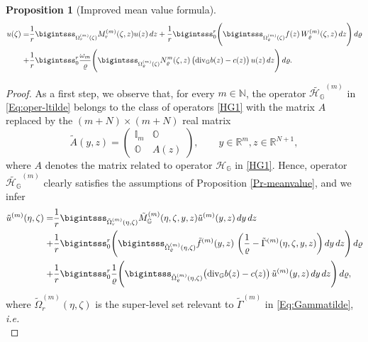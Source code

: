 \documentclass[11pt,a4paper]{article}
\newtheorem{proposition}[theorem]{\bf Proposition}
\numberwithin{equation}{section}
\newcommand{\R}{\mathbb{R}}
\newcommand{\N}{\mathbb{N}}
\def \rnn {{\mathbb {R}}^{N+1}}
\def \r {\varrho}
\def \GG {{\mathbb{G}}}
\def \div {{\text{\rm div}}}
\def \H {\mathscr{H}_\GG}
\def \y {{\eta}}
\def \z {{\zeta}}
\begin{document}
{{\begin{proposition}[Improved mean value formula]
	\begin{equation} \label{e-meanvalue} 
		\begin{aligned}
			u(\z) =& \frac{1}{r} \bigintsss_{\Omega_r^{(m)}(\z)} M_r^{(m)} (\z, z) u(z) \, dz 
			+ \frac{1}{r}  \bigintsss_0^{r} \Biggl(
			\bigintsss_{\Omega^{(m)}_\r (\z)} f (z) \, W_\r^{(m)}(\z,z) \, dz \Biggr)\, d \r \\
			+&\frac{1}{r} \bigintsss_0^{r} \frac{\omega_m}{\r} \Biggl(
			\bigintsss_{\Omega^{(m)}_\r (\z)}N_\r^m(\z,z)\, \big( \div_\GG b(z) - c(z) \big) \,u(z) \, dz \Biggr) \, d \r. 
		\end{aligned}
	\end{equation} 
\end{proposition}
\begin{proof}
	As a first step, we observe that, for every $m \in \N$, the operator $\tilde{\H}^{(m)}$ in \eqref{Eq:oper-ltilde} belongs to the class of operators \eqref{HG1} with the matrix $A$ replaced by the $(m+N) \times (m+N)$ real matrix
	\begin{equation*}
		\tilde{A}(y,z)=\begin{pmatrix}\mathbb{I}_m  &\mathbb{O}\\\mathbb{O} & A(z)\end{pmatrix},\qquad y\in\R^{m},z\in\rnn,
	\end{equation*}
	where $A$ denotes the matrix related to operator $\H$ in \eqref{HG1}. Hence, operator $\tilde{\H}^{(m)}$ clearly satisfies the assumptions of Proposition \ref{Pr-meanvalue}, and we infer 
	\begin{equation}\label{Eq:meanMtilde}
		\begin{aligned}
			\tilde{u}^{(m)}(\y,\z)= &\frac{1}{r} \bigintsss_{\tilde{\Omega}_r^{(m)}(\y,\z)} \tilde{M}_\GG^{(m)} (\y,\z, y,z) \tilde{u}^{(m)}(y,z)\, dy\, dz \\
			+& \frac{1}{r}  \bigintsss_0^{r} \Biggl(
			\bigintsss_{\tilde{\Omega}^{(m)}_\r (\y,\z)} \tilde{f}^{(m)}(y,z) \,\left(\frac{1}{\r}-\tilde{\Gamma}^{(m)}(\y,\z,y,z) \right)dy  \, dz \Biggr)\, d \r 
			\\
			+&\frac{1}{r} \bigintsss_0^{r}  \frac{1}{\r} \Biggl(
			\bigintsss_{\tilde{\Omega}^{(m)}_\r (\y,\z)} \big( \div_\GG b(z) - c(z) \big) \,\tilde{u}^{(m)}(y,z)\,dy \, dz \Biggr) \, d \r,
		\end{aligned}	
	\end{equation}
	where $\tilde{\Omega}^{(m)}_r(\y,\z)$ is the super-level set relevant to $\tilde{\Gamma}^{(m)}$ in \eqref{Eq:Gammatilde}, \emph{i.e.}
	\begin{equation}\label{Eq:omegatildem}

\end{equation}
\end{proof}}}
\end{document}
